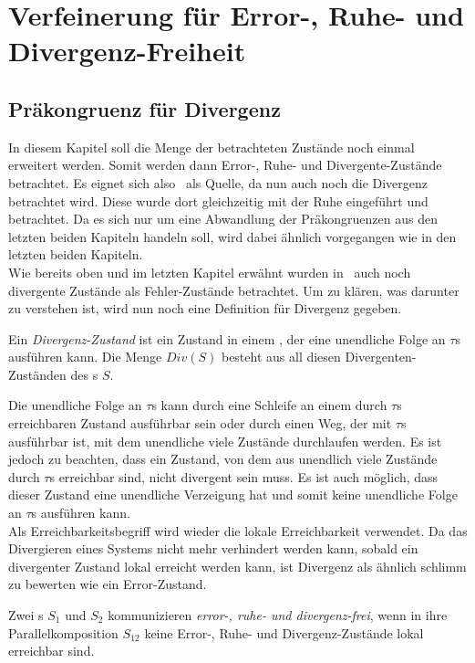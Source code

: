 \chapter{Verfeinerung für Error-, Ruhe- und Divergenz-Freiheit}

\section{Präkongruenz für Divergenz}

In diesem Kapitel soll die Menge der betrachteten Zustände noch einmal
erweitert werden. Somit werden dann Error-, Ruhe- und
Divergente-Zustände betrachtet. Es eignet sich also~\cite{Chilton2013} als
Quelle, da nun auch noch die Divergenz betrachtet wird. Diese wurde dort
gleichzeitig mit der Ruhe eingeführt und betrachtet. Da es sich nur um eine
Abwandlung der Präkongruenzen aus den letzten beiden Kapiteln handeln soll, wird
dabei ähnlich vorgegangen wie in den letzten beiden Kapiteln.\\
Wie bereits oben und im letzten Kapitel erwähnt wurden in~\cite{Chilton2013}
auch noch divergente Zustände als Fehler-Zustände betrachtet. Um zu klären, was
darunter zu verstehen ist, wird nun noch eine Definition für Divergenz gegeben.

\begin{Def}[Divergenz]
  Ein \emph{Divergenz-Zustand} ist ein Zustand in einem \EIO{}, der eine
  unendliche Folge an $\tau$s ausführen kann. Die Menge $Div(S)$ besteht aus all
  diesen Divergenten-Zuständen des \EIO{}s $S$.
\end{Def}

Die unendliche Folge an $\tau$s kann durch eine Schleife an einem durch $\tau$s
erreichbaren Zustand ausführbar sein oder durch einen Weg, der mit $\tau$s
ausführbar ist, mit dem
unendliche viele Zustände durchlaufen werden. Es ist jedoch zu beachten, dass
ein Zustand, von dem aus unendlich viele Zustände durch $\tau$s erreichbar sind,
nicht divergent sein muss. Es ist auch möglich, dass dieser Zustand eine
unendliche Verzeigung hat und somit keine unendliche Folge an $\tau$s ausführen
kann.\\
Als Erreichbarkeitsbegriff wird wieder die lokale Erreichbarkeit verwendet.
Da das Divergieren eines Systems nicht mehr verhindert werden kann, sobald ein
divergenter Zustand lokal erreicht werden kann, ist Divergenz als ähnlich
\glqq{}schlimm\grqq{} zu bewerten wie ein Error-Zustand.

\begin{Def}
  Zwei \linebreak\EIO{}s $S_1$ und $S_2$ kommunizieren \emph{error-, ruhe- und
  divergenz-frei}, wenn in ihre Parallelkomposition $S_{12}$ keine Error-,
  Ruhe- und Divergenz-Zustände lokal erreichbar sind.
\end{Def}

